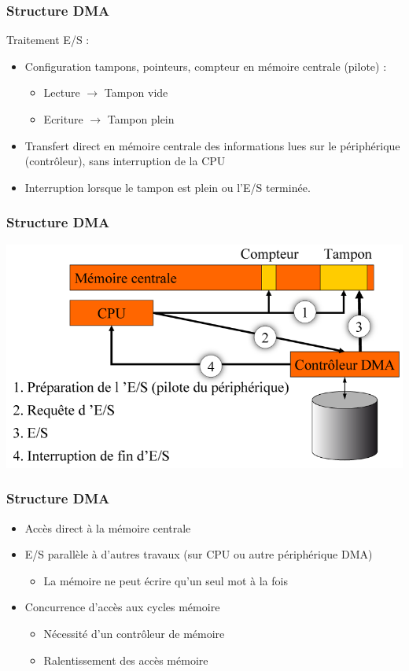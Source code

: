 \begin{frame}
\frametitle{Structure DMA}
Traitement E/S :
\begin{itemize}
\item Configuration tampons, pointeurs, compteur en mémoire centrale (pilote) :
\begin{itemize}
\item Lecture $\rightarrow$ Tampon vide
\item Ecriture $\rightarrow$ Tampon plein
\end{itemize}
\item Transfert direct en mémoire centrale des informations lues sur le périphérique (contrôleur), sans interruption de la CPU
\item Interruption lorsque le tampon est plein ou l’E/S terminée.
\end{itemize}
\end{frame}


\begin{frame}
\frametitle{Structure DMA}
\includegraphics[width=\textwidth]{../illustration/traitement_DMA.png}
\end{frame}


\begin{frame}
\frametitle{Structure DMA}
\begin{itemize}
\item Accès direct à la mémoire centrale
\item E/S parallèle à d’autres travaux (sur CPU ou autre périphérique DMA)
\begin{itemize}
\item La mémoire ne peut écrire qu’un seul mot à la fois
\end{itemize}
\item Concurrence d’accès aux cycles mémoire
\begin{itemize}
\item Nécessité d’un contrôleur de mémoire
\item Ralentissement des accès mémoire
\end{itemize}
\end{itemize}
\end{frame}


